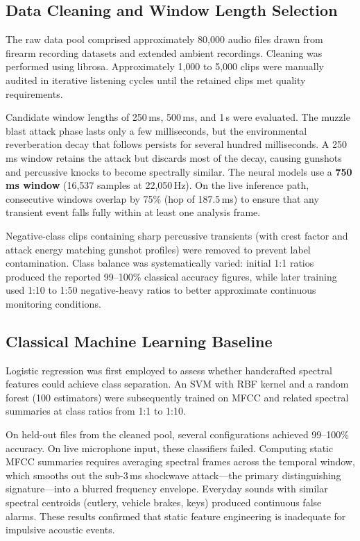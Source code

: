 \documentclass[conference]{IEEEtran}
\begin{document}
\subsection{Data Cleaning and Window Length Selection}
The raw data pool comprised approximately 80{,}000 audio files drawn from firearm recording datasets and extended ambient recordings. Cleaning was performed using librosa. Approximately 1{,}000 to 5{,}000 clips were manually audited in iterative listening cycles until the retained clips met quality requirements.

Candidate window lengths of 250\,ms, 500\,ms, and 1\,s were evaluated. The muzzle blast attack phase lasts only a few milliseconds, but the environmental reverberation decay that follows persists for several hundred milliseconds. A 250\,ms window retains the attack but discards most of the decay, causing gunshots and percussive knocks to become spectrally similar. The neural models use a \textbf{750\,ms window} (16{,}537 samples at 22{,}050\,Hz). On the live inference path, consecutive windows overlap by 75\% (hop of 187.5\,ms) to ensure that any transient event falls fully within at least one analysis frame.

Negative-class clips containing sharp percussive transients (with crest factor and attack energy matching gunshot profiles) were removed to prevent label contamination. Class balance was systematically varied: initial 1:1 ratios produced the reported 99--100\% classical accuracy figures, while later training used 1:10 to 1:50 negative-heavy ratios to better approximate continuous monitoring conditions.

\subsection{Classical Machine Learning Baseline}
Logistic regression was first employed to assess whether handcrafted spectral features could achieve class separation. An SVM with RBF kernel and a random forest (100 estimators) were subsequently trained on MFCC and related spectral summaries at class ratios from 1:1 to 1:10.

On held-out files from the cleaned pool, several configurations achieved 99--100\% accuracy. On live microphone input, these classifiers failed. Computing static MFCC summaries requires averaging spectral frames across the temporal window, which smooths out the sub-3\,ms shockwave attack---the primary distinguishing signature---into a blurred frequency envelope. Everyday sounds with similar spectral centroids (cutlery, vehicle brakes, keys) produced continuous false alarms. These results confirmed that static feature engineering is inadequate for impulsive acoustic events.
\end{document}
